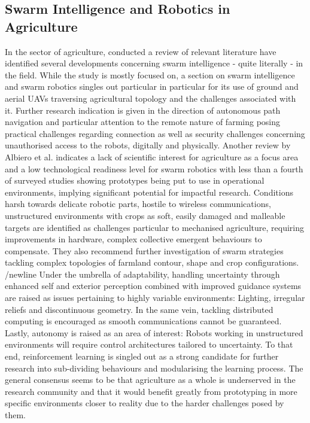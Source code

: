 \documentclass{article}
\begin{document}
\subsection{Swarm Intelligence and Robotics in Agriculture}
In the sector of agriculture, \cite{Sharma2022SwarmIntelligenceAgriculture} conducted a review of relevant literature have identified several developments concerning swarm intelligence - quite literally - in the field. While the study is mostly focused on, a section on swarm intelligence and swarm robotics singles out particular \cite{botteghi2020agriPath} in particular for its use of ground and aerial UAVs traversing agricultural topology and the challenges associated with it. \newline %
Further research indication is given in the direction of autonomous path navigation and particular attention to the remote nature of farming posing practical challenges regarding connection as well as security challenges concerning unauthorised access to the robots, digitally and physically.
Another review by Albiero et al. \cite{albiero2022swarmAgri} indicates a lack of scientific interest for agriculture as a focus area and a low technological readiness level for swarm robotics with less than a fourth of surveyed studies showing prototypes being put to use in operational environments, implying significant potential for impactful research. Conditions harsh towards delicate robotic parts, hostile to wireless communications, unstructured environments with crops as soft, easily damaged and malleable targets are identified as challenges particular to mechanised agriculture, requiring improvements in hardware, complex collective emergent behaviours to compensate. They also recommend further investigation of swarm strategies tackling complex topologies of farmland contour, shape and crop configurations. /newline
Under the umbrella of adaptability, handling uncertainty through enhanced self and exterior perception combined with improved guidance systems are raised as issues pertaining to highly variable environments: Lighting, irregular reliefs and discontinuous geometry. In the same vein, tackling distributed computing is encouraged as smooth communications cannot be guaranteed. \newline
Lastly, autonomy is raised as an area of interest: Robots working in unstructured environments will require control architectures tailored to uncertainty. To that end, reinforcement learning is singled out as a strong candidate for further research into sub-dividing behaviours and modularising the learning process.
The general consensus seems to be that agriculture as a whole is underserved in the research community and that it would benefit greatly from prototyping in more specific environments closer to reality due to the harder challenges posed by them.
\end{document}
